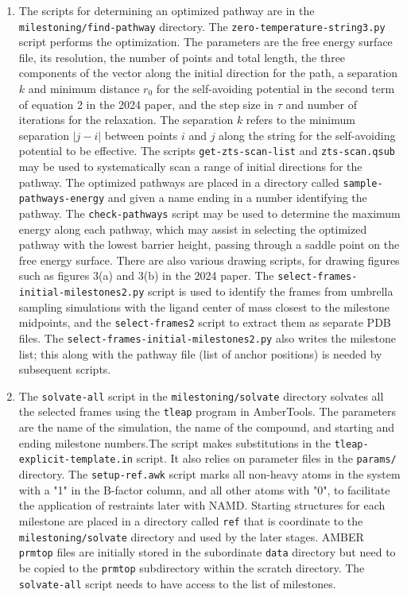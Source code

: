 \documentclass{article}      %
\begin{document}
\begin{enumerate}
\item The scripts for determining an optimized pathway are in the \verb+milestoning/find-pathway+ directory.  The \verb+zero-temperature-string3.py+ script performs the optimization.  The parameters are the free energy surface file, its resolution, the number of points and total length, the three components of the vector along the initial direction for the path, a separation $k$ and minimum distance $r_0$ for the self-avoiding potential in the second term of equation 2 in the 2024 paper, and the step size in $\tau$ and number of iterations for the relaxation.   The separation $k$ refers to the minimum separation $|j-i|$ between points $i$ and $j$ along the string for the self-avoiding potential to be effective.  The scripts \verb+get-zts-scan-list+ and \verb+zts-scan.qsub+ may be used to systematically scan a range of initial directions for the pathway.  The optimized pathways are placed in a directory called \verb+sample-pathways-energy+ and given a name ending in a number identifying the pathway.  The \verb+check-pathways+ script may be used to determine the maximum energy along each pathway, which may assist in selecting the  optimized pathway with the lowest barrier height, passing through a saddle point on the free energy surface.  There are also various drawing scripts, for drawing figures such as figures 3(a) and 3(b) in the 2024 paper. The \verb+select-frames-initial-milestones2.py+ script is used to identify the frames from umbrella sampling simulations with the ligand center of mass closest to the milestone midpoints, and the \verb+select-frames2+ script to extract them as separate PDB files.  The \verb+select-frames-initial-milestones2.py+ also writes the milestone list; this along with the pathway file (list of anchor positions) is needed by subsequent scripts.

\item The \verb+solvate-all+ script in the \verb+milestoning/solvate+ directory solvates all the selected frames using the \verb+tleap+ program in AmberTools.  The parameters are the name of the simulation, the name of the compound, and starting and ending milestone numbers.The script makes substitutions in the  \verb+tleap-explicit-template.in+ script.  It also relies on parameter files in the  \verb+params/+ directory.  The \verb+setup-ref.awk+ script marks all non-heavy  atoms in the system with a "1" in the B-factor column, and all other atoms with "0", to facilitate the application of restraints later with NAMD.   Starting structures for each milestone are placed in a directory called \verb+ref+ that is coordinate to the \verb+milestoning/solvate+ directory and used by the later stages.  AMBER \verb+prmtop+ files are initially stored in the subordinate \verb+data+ directory but need to be copied to the \verb+prmtop+ subdirectory within the scratch directory.  The \verb+solvate-all+ script needs to have access to the list of milestones.


\end{enumerate}
\end{document}
